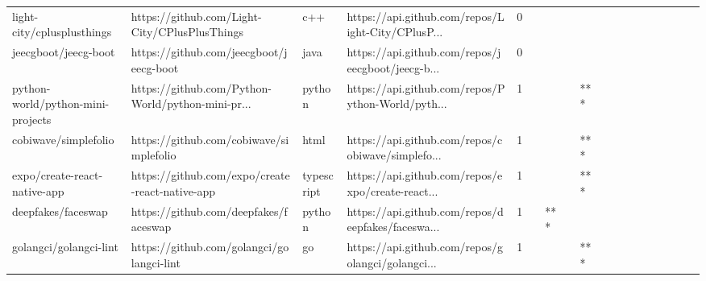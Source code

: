\begin{tabular}{llllrlllllllllllll}
light-city/cplusplusthings                         &      https://github.com/Light-City/CPlusPlusThings &               c++ &  https://api.github.com/repos/Light-City/CPlusP... &       0 &         &        &           &                &                 &        &           &           &          &          &       &              &          \\
jeecgboot/jeecg-boot                               &            https://github.com/jeecgboot/jeecg-boot &              java &  https://api.github.com/repos/jeecgboot/jeecg-b... &       0 &         &        &           &                &                 &        &           &           &          &          &       &              &          \\
python-world/python-mini-projects                  &  https://github.com/Python-World/python-mini-pr... &            python &  https://api.github.com/repos/Python-World/pyth... &       1 &         &        &           &            *** &                 &        &           &           &          &          &       &              &          \\
cobiwave/simplefolio                               &            https://github.com/cobiwave/simplefolio &              html &  https://api.github.com/repos/cobiwave/simplefo... &       1 &         &        &           &            *** &                 &        &           &           &          &          &       &              &          \\
expo/create-react-native-app                       &    https://github.com/expo/create-react-native-app &        typescript &  https://api.github.com/repos/expo/create-react... &       1 &         &        &           &            *** &                 &        &           &           &          &          &       &              &          \\
deepfakes/faceswap                                 &              https://github.com/deepfakes/faceswap &            python &  https://api.github.com/repos/deepfakes/faceswa... &       1 &         &    *** &           &                &                 &        &           &           &          &          &       &              &          \\
golangci/golangci-lint                             &          https://github.com/golangci/golangci-lint &                go &  https://api.github.com/repos/golangci/golangci... &       1 &         &        &           &            *** &                 &        &           &           &          &          &       &              &          \\

\end{tabular}
